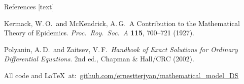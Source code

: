 \documentclass[14pt,aspectratio=169]{beamer}
\begin{document}
\begin{frame}[allowframebreaks]{References}
 [text]
 \footnotesize
 \begin{thebibliography}{99}

      Kermack, W.\,O.\ and McKendrick, A.\,G.\
      \newblock A Contribution to the Mathematical Theory of Epidemics. 
      \newblock \emph{Proc.\ Roy.\ Soc.\ A} \textbf{115}, 700–721 (1927).

      Polyanin, A.\,D.\ and Zaitsev, V.\,F.\
      \newblock \emph{Handbook of Exact Solutions for Ordinary Differential Equations}. 
      \newblock 2nd ed., Chapman \& Hall/CRC (2002).

 \end{thebibliography}
\end{frame}

\begin{frame}[plain]
    \vfill
    \vfill
    All code and \LaTeX\ at:\ \href{https://github.com/ernestterjyan/mathematical_model_DS}{github.com/ernestterjyan/mathematical\_model\_DS}
    \vfill
\end{frame}
\end{document}

